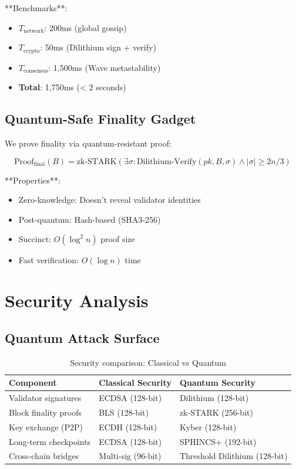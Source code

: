 \documentclass[11pt,letterpaper]{article}
\begin{document}
**Benchmarks**:
\begin{itemize}
    \item $T_{\text{network}}$: 200ms (global gossip)
    \item $T_{\text{crypto}}$: 50ms (Dilithium sign + verify)
    \item $T_{\text{consensus}}$: 1,500ms (Wave metastability)
    \item \textbf{Total}: 1,750ms (< 2 seconds)
\end{itemize}

\subsection{Quantum-Safe Finality Gadget}

We prove finality via quantum-resistant proof:

\begin{equation}
\text{Proof}_{\text{final}}(B) = \text{zk-STARK}(\exists \sigma : \text{Dilithium-Verify}(pk, B, \sigma) \land |\sigma| \geq 2n/3)
\end{equation}

**Properties**:
\begin{itemize}
    \item Zero-knowledge: Doesn't reveal validator identities
    \item Post-quantum: Hash-based (SHA3-256)
    \item Succinct: $O(\log^2 n)$ proof size
    \item Fast verification: $O(\log n)$ time
\end{itemize}

\section{Security Analysis}

\subsection{Quantum Attack Surface}

\begin{table}[h]
\centering
\begin{tabular}{lll}
\toprule
\textbf{Component} & \textbf{Classical Security} & \textbf{Quantum Security} \\
\midrule
Validator signatures & ECDSA (128-bit) & Dilithium (128-bit) \\
Block finality proofs & BLS (128-bit) & zk-STARK (256-bit) \\
Key exchange (P2P) & ECDH (128-bit) & Kyber (128-bit) \\
Long-term checkpoints & ECDSA (128-bit) & SPHINCS+ (192-bit) \\
Cross-chain bridges & Multi-sig (96-bit) & Threshold Dilithium (128-bit) \\
\bottomrule
\end{tabular}
\caption{Security comparison: Classical vs Quantum}
\end{table}
\end{document}
